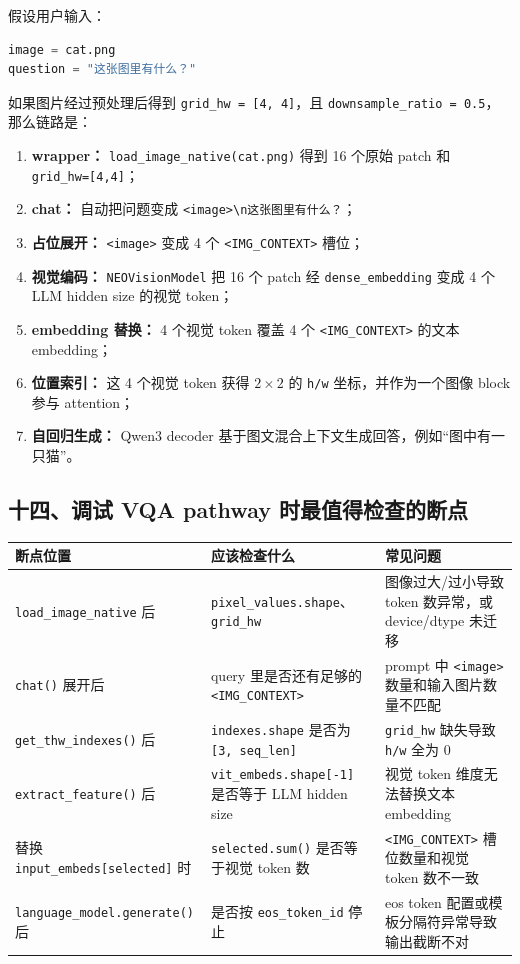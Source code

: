 假设用户输入：

\begin{lstlisting}[language=Python]
image = cat.png
question = "这张图里有什么？"
\end{lstlisting}

如果图片经过预处理后得到 \texttt{grid\_hw = [4, 4]}，且 \texttt{downsample\_ratio = 0.5}，那么链路是：

\begin{enumerate}[leftmargin=1.8em]
  \item \textbf{wrapper：} \texttt{load\_image\_native(cat.png)} 得到 16 个原始 patch 和 \texttt{grid\_hw=[4,4]}；
  \item \textbf{chat：} 自动把问题变成 \texttt{<image>\textbackslash n这张图里有什么？}；
  \item \textbf{占位展开：} \texttt{<image>} 变成 4 个 \texttt{<IMG\_CONTEXT>} 槽位；
  \item \textbf{视觉编码：} \texttt{NEOVisionModel} 把 16 个 patch 经 \texttt{dense\_embedding} 变成 4 个 LLM hidden size 的视觉 token；
  \item \textbf{embedding 替换：} 4 个视觉 token 覆盖 4 个 \texttt{<IMG\_CONTEXT>} 的文本 embedding；
  \item \textbf{位置索引：} 这 4 个视觉 token 获得 \(2 \times 2\) 的 \texttt{h/w} 坐标，并作为一个图像 block 参与 attention；
  \item \textbf{自回归生成：} Qwen3 decoder 基于图文混合上下文生成回答，例如“图中有一只猫”。
\end{enumerate}

\subsection{十四、调试 VQA pathway 时最值得检查的断点}

\begin{center}
{\small
\begin{tabular}{p{3.4cm}p{5.0cm}p{6.0cm}}
\hline
\textbf{断点位置} & \textbf{应该检查什么} & \textbf{常见问题} \\
\hline
\texttt{load\_image\_native} 后 & \texttt{pixel\_values.shape}、\texttt{grid\_hw} & 图像过大/过小导致 token 数异常，或 device/dtype 未迁移 \\
\texttt{chat()} 展开后 & query 里是否还有足够的 \texttt{<IMG\_CONTEXT>} & prompt 中 \texttt{<image>} 数量和输入图片数量不匹配 \\
\texttt{get\_thw\_indexes()} 后 & \texttt{indexes.shape} 是否为 \texttt{[3, seq\_len]} & \texttt{grid\_hw} 缺失导致 \texttt{h/w} 全为 0 \\
\texttt{extract\_feature()} 后 & \texttt{vit\_embeds.shape[-1]} 是否等于 LLM hidden size & 视觉 token 维度无法替换文本 embedding \\
替换 \texttt{input\_embeds[selected]} 时 & \texttt{selected.sum()} 是否等于视觉 token 数 & \texttt{<IMG\_CONTEXT>} 槽位数量和视觉 token 数不一致 \\
\texttt{language\_model.generate()} 后 & 是否按 \texttt{eos\_token\_id} 停止 & eos token 配置或模板分隔符异常导致输出截断不对 \\
\hline
\end{tabular}
}
\end{center}

